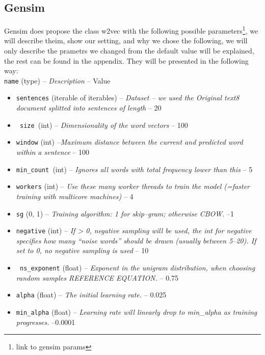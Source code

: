 \subsection{Gensim}
Gensim does propose the class w2vec with the following possible parameters\footnote{link to gensim params}, we will describe theim, show our setting, and why we chose the following, we will only describe the prametrs we changed from the default value will be explained, the rest can be found in the appendix. 
They will be presented in the following way: \\
\texttt{name} (type) -- \textit{Description} -- Value
\begin{itemize}
   \item \texttt{sentences} (iterable of iterables) -- \textit{Dataset -- we used the Original text8 document splitted into sentences of length} -- 20
  \item \texttt{ size }(int) – \textit{Dimensionality of the word vectors }-- 100
\item    \texttt{window} (int) --\textit {Maximum distance between the current and predicted word within a sentence }-- 100
  \item  \texttt{min\_count }(int) --\textit{ Ignores all words with total frequency lower than this }-- 5
 \item   \texttt{workers} (int) -- \textit{ Use these many worker threads to train the model (=faster training with multicore machines) }-- 4 
\item    \texttt{sg} ({0, 1}) --\textit{ Training algorithm: 1 for skip--gram; otherwise CBOW. }--1
  \item  \texttt{negative} (int) --\textit{ If > 0, negative sampling will be used, the int for negative specifies how many “noise words” should be drawn (usually between 5--20). If set to 0, no negative sampling is used }-- 10 
\item   \texttt{ ns\_exponent} (float) --\textit{ Exponent in the unigram distribution, when choosing random samples REFERENCE EQUATION. }-- 0.75
\item    \texttt{alpha} (float) --\textit{ The initial learning rate. }-- 0.025
 \item   \texttt{min\_alpha} (float) --\textit{ Learning rate will linearly drop to min\_alpha as training progresses. }--0.0001


\end{itemize}
